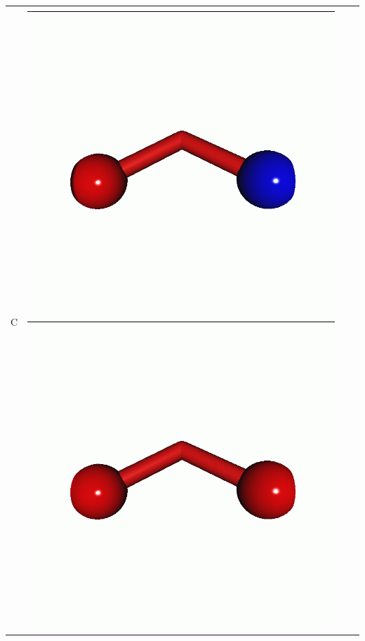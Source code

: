 \documentclass[journal=jctcce,manuscript=article]{achemso}
\begin{document}
\begin{table}[H]
\begin{tabular}{ c | c c c }
\begin{minipage}{0.2\textwidth}
    \end{minipage}
    \\
            C	 &  
    \begin{minipage}{0.2\textwidth}
        \centering
        \includegraphics[scale=0.10]{NTO/O3/3h_063.png}
        \includegraphics[scale=0.10]{NTO/O3/3h_019.png}

\end{minipage}
\end{tabular}
\end{table}
\end{document}
